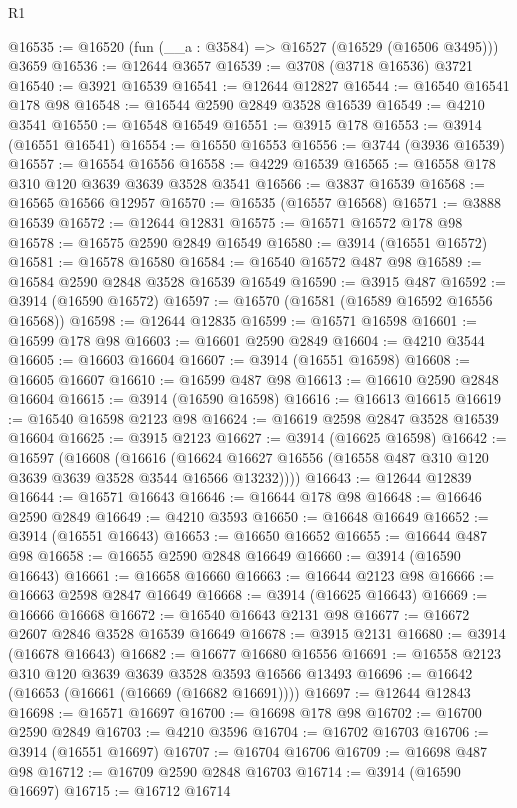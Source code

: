 \begin{lexlean}{R1}
\begin{coremodule}
@16535 := @16520 (fun (__a : @3584) => @16527 (@16529 (@16506 @3495))) @3659
@16536 := @12644 @3657
@16539 := @3708 (@3718 @16536) @3721
@16540 := @3921 @16539
@16541 := @12644 @12827
@16544 := @16540 @16541 @178 @98
@16548 := @16544 @2590 @2849 @3528 @16539
@16549 := @4210 @3541
@16550 := @16548 @16549
@16551 := @3915 @178
@16553 := @3914 (@16551 @16541)
@16554 := @16550 @16553
@16556 := @3744 (@3936 @16539)
@16557 := @16554 @16556
@16558 := @4229 @16539
@16565 := @16558 @178 @310 @120 @3639 @3639 @3528 @3541
@16566 := @3837 @16539
@16568 := @16565 @16566 @12957
@16570 := @16535 (@16557 @16568)
@16571 := @3888 @16539
@16572 := @12644 @12831
@16575 := @16571 @16572 @178 @98
@16578 := @16575 @2590 @2849 @16549
@16580 := @3914 (@16551 @16572)
@16581 := @16578 @16580
@16584 := @16540 @16572 @487 @98
@16589 := @16584 @2590 @2848 @3528 @16539 @16549
@16590 := @3915 @487
@16592 := @3914 (@16590 @16572)
@16597 := @16570 (@16581 (@16589 @16592 @16556 @16568))
@16598 := @12644 @12835
@16599 := @16571 @16598
@16601 := @16599 @178 @98
@16603 := @16601 @2590 @2849
@16604 := @4210 @3544
@16605 := @16603 @16604
@16607 := @3914 (@16551 @16598)
@16608 := @16605 @16607
@16610 := @16599 @487 @98
@16613 := @16610 @2590 @2848 @16604
@16615 := @3914 (@16590 @16598)
@16616 := @16613 @16615
@16619 := @16540 @16598 @2123 @98
@16624 := @16619 @2598 @2847 @3528 @16539 @16604
@16625 := @3915 @2123
@16627 := @3914 (@16625 @16598)
@16642 := @16597
    (@16608
      (@16616 (@16624 @16627 @16556 (@16558 @487 @310 @120 @3639 @3639 @3528 @3544 @16566 @13232))))
@16643 := @12644 @12839
@16644 := @16571 @16643
@16646 := @16644 @178 @98
@16648 := @16646 @2590 @2849
@16649 := @4210 @3593
@16650 := @16648 @16649
@16652 := @3914 (@16551 @16643)
@16653 := @16650 @16652
@16655 := @16644 @487 @98
@16658 := @16655 @2590 @2848 @16649
@16660 := @3914 (@16590 @16643)
@16661 := @16658 @16660
@16663 := @16644 @2123 @98
@16666 := @16663 @2598 @2847 @16649
@16668 := @3914 (@16625 @16643)
@16669 := @16666 @16668
@16672 := @16540 @16643 @2131 @98
@16677 := @16672 @2607 @2846 @3528 @16539 @16649
@16678 := @3915 @2131
@16680 := @3914 (@16678 @16643)
@16682 := @16677 @16680 @16556
@16691 := @16558 @2123 @310 @120 @3639 @3639 @3528 @3593 @16566 @13493
@16696 := @16642 (@16653 (@16661 (@16669 (@16682 @16691))))
@16697 := @12644 @12843
@16698 := @16571 @16697
@16700 := @16698 @178 @98
@16702 := @16700 @2590 @2849
@16703 := @4210 @3596
@16704 := @16702 @16703
@16706 := @3914 (@16551 @16697)
@16707 := @16704 @16706
@16709 := @16698 @487 @98
@16712 := @16709 @2590 @2848 @16703
@16714 := @3914 (@16590 @16697)
@16715 := @16712 @16714

\end{coremodule}
\end{lexlean}

